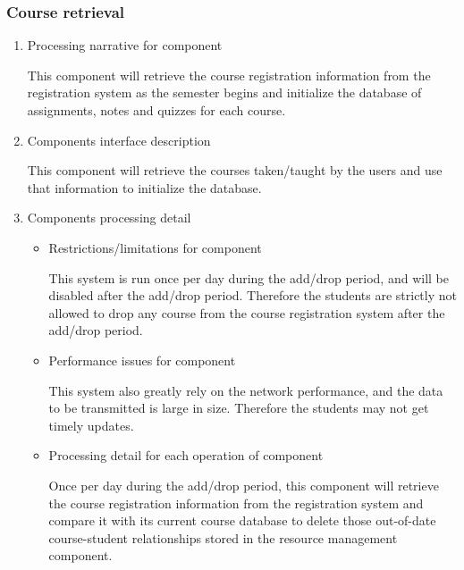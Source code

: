 \documentclass[paper=a4, fontsize=11pt]{scrartcl}
\numberwithin{equation}{section}		%
\numberwithin{figure}{section}			%
\numberwithin{table}{section}				%
\begin{document}
\subsubsection{Course retrieval}
\begin{enumerate}
	\item Processing narrative for component
	\par This component will retrieve the course registration information from the registration system as the semester begins and initialize the database of assignments, notes and quizzes for each course.
	\item Components interface description
	\par This component will retrieve the courses taken/taught by the users and use that information to initialize the database.
	\item Components processing detail
	\begin{itemize}
		\item Restrictions/limitations for component
		\par This system is run once per day during the add/drop period, and will be disabled after the add/drop period. Therefore the students are strictly not allowed to drop any course from the course registration system after the add/drop period.
		
		\item Performance issues for component 
		\par This system also greatly rely on the network performance, and the data to be transmitted is large in size. Therefore the students may not get timely updates. 
		\item Processing detail for each operation of component 
		\par Once per day during the add/drop period, this component will retrieve the course registration information from the registration system and compare it with its current course database to delete those out-of-date course-student relationships stored in the resource management component.
	\end{itemize}
\end{enumerate}
\end{document}
